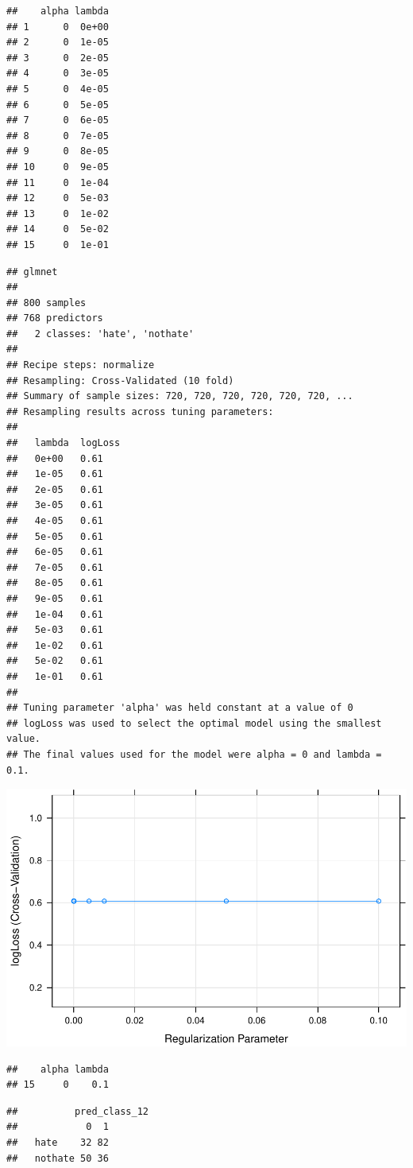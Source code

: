 \documentclass[
  english,
  man]{apa6}
\begin{document}
\begin{verbatim}
##    alpha lambda
## 1      0  0e+00
## 2      0  1e-05
## 3      0  2e-05
## 4      0  3e-05
## 5      0  4e-05
## 6      0  5e-05
## 7      0  6e-05
## 8      0  7e-05
## 9      0  8e-05
## 10     0  9e-05
## 11     0  1e-04
## 12     0  5e-03
## 13     0  1e-02
## 14     0  5e-02
## 15     0  1e-01
\end{verbatim}

\begin{verbatim}
## glmnet 
## 
## 800 samples
## 768 predictors
##   2 classes: 'hate', 'nothate' 
## 
## Recipe steps: normalize 
## Resampling: Cross-Validated (10 fold) 
## Summary of sample sizes: 720, 720, 720, 720, 720, 720, ... 
## Resampling results across tuning parameters:
## 
##   lambda  logLoss
##   0e+00   0.61   
##   1e-05   0.61   
##   2e-05   0.61   
##   3e-05   0.61   
##   4e-05   0.61   
##   5e-05   0.61   
##   6e-05   0.61   
##   7e-05   0.61   
##   8e-05   0.61   
##   9e-05   0.61   
##   1e-04   0.61   
##   5e-03   0.61   
##   1e-02   0.61   
##   5e-02   0.61   
##   1e-01   0.61   
## 
## Tuning parameter 'alpha' was held constant at a value of 0
## logLoss was used to select the optimal model using the smallest value.
## The final values used for the model were alpha = 0 and lambda = 0.1.
\end{verbatim}

\includegraphics{analysis_files/figure-latex/unnamed-chunk-11-1.pdf}

\begin{verbatim}
##    alpha lambda
## 15     0    0.1
\end{verbatim}

\begin{verbatim}
##          pred_class_12
##            0  1
##   hate    32 82
##   nothate 50 36
\end{verbatim}
\end{document}
